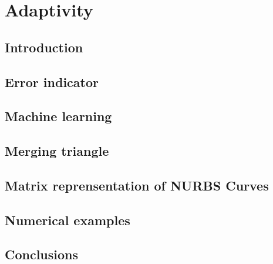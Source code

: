 
\chapter{Adaptivity}
\label{adp_sec:main}
\section{Introduction}

\section{Error indicator}
\label{adap_error_indicator}


\section{Machine learning}



\section{Merging triangle}
\label{adap_merge_triangle}




\section{Matrix reprensentation of NURBS Curves}
\label{adap_sec_mrep2d}



\section{Numerical examples}




\section{Conclusions}


